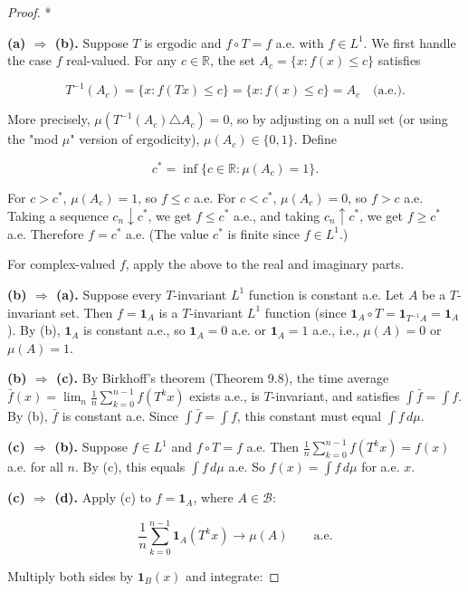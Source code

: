 \begin{proof}
*

\textbf{(a) $\Rightarrow$ (b).} Suppose $T$ is ergodic and $f \circ T = f$ a.e. with $f \in L^1$. We first handle the case $f$ real-valued. For any $c \in \mathbb{R}$, the set $A_c = \{x : f(x) \leq c\}$ satisfies

\[
T^{-1}(A_c) = \{x : f(Tx) \leq c\} = \{x : f(x) \leq c\} = A_c \quad \text{(a.e.)}.
\]

More precisely, $\mu(T^{-1}(A_c) \triangle A_c) = 0$, so by adjusting on a null set (or using the "mod $\mu$" version of ergodicity), $\mu(A_c) \in \{0, 1\}$. Define

\[
c^* = \inf\{c \in \mathbb{R} : \mu(A_c) = 1\}.
\]

For $c > c^*$, $\mu(A_c) = 1$, so $f \leq c$ a.e. For $c < c^*$, $\mu(A_c) = 0$, so $f > c$ a.e. Taking a sequence $c_n \downarrow c^*$, we get $f \leq c^*$ a.e., and taking $c_n \uparrow c^*$, we get $f \geq c^*$ a.e. Therefore $f = c^*$ a.e. (The value $c^*$ is finite since $f \in L^1$.)

For complex-valued $f$, apply the above to the real and imaginary parts.

\textbf{(b) $\Rightarrow$ (a).} Suppose every $T$-invariant $L^1$ function is constant a.e. Let $A$ be a $T$-invariant set. Then $f = \mathbf{1}_A$ is a $T$-invariant $L^1$ function (since $\mathbf{1}_A \circ T = \mathbf{1}_{T^{-1}A} = \mathbf{1}_A$). By (b), $\mathbf{1}_A$ is constant a.e., so $\mathbf{1}_A = 0$ a.e. or $\mathbf{1}_A = 1$ a.e., i.e., $\mu(A) = 0$ or $\mu(A) = 1$.

\textbf{(b) $\Rightarrow$ (c).} By Birkhoff's theorem (Theorem 9.8), the time average $\bar{f}(x) = \lim_n \frac{1}{n}\sum_{k=0}^{n-1} f(T^k x)$ exists a.e., is $T$-invariant, and satisfies $\int \bar{f} = \int f$. By (b), $\bar{f}$ is constant a.e. Since $\int \bar{f} = \int f$, this constant must equal $\int f \, d\mu$.

\textbf{(c) $\Rightarrow$ (b).} Suppose $f \in L^1$ and $f \circ T = f$ a.e. Then $\frac{1}{n}\sum_{k=0}^{n-1} f(T^k x) = f(x)$ a.e. for all $n$. By (c), this equals $\int f \, d\mu$ a.e. So $f(x) = \int f \, d\mu$ for a.e. $x$.

\textbf{(c) $\Rightarrow$ (d).} Apply (c) to $f = \mathbf{1}_A$, where $A \in \mathcal{B}$:

\[
\frac{1}{n} \sum_{k=0}^{n-1} \mathbf{1}_A(T^k x) \to \mu(A) \qquad \text{a.e.}
\]

Multiply both sides by $\mathbf{1}_B(x)$ and integrate:


\end{proof}
